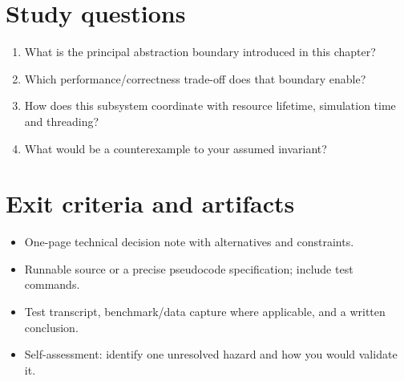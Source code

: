 \documentclass[11pt,letterpaper]{article}
\begin{document}
\section{Study questions}
\begin{enumerate}
\item What is the principal abstraction boundary introduced in this chapter?
\item Which performance/correctness trade-off does that boundary enable?
\item How does this subsystem coordinate with resource lifetime, simulation time and threading?
\item What would be a counterexample to your assumed invariant?
\end{enumerate}
\section{Exit criteria and artifacts}
\begin{itemize}
\item One-page technical decision note with alternatives and constraints.
\item Runnable source or a precise pseudocode specification; include test commands.
\item Test transcript, benchmark/data capture where applicable, and a written conclusion.
\item Self-assessment: identify one unresolved hazard and how you would validate it.
\end{itemize}
\end{document}
